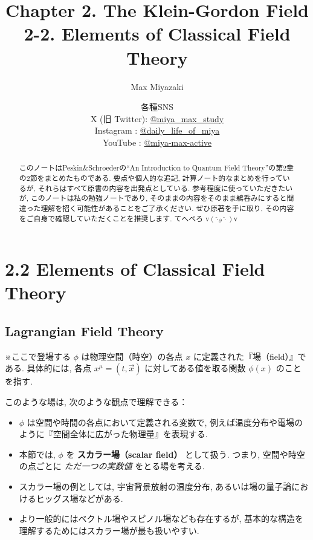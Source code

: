 \documentclass[a4paper,12pt]{article}
\title{Chapter 2. The Klein-Gordon Field\\
2-2. Elements of Classical Field Theory}
\date{各種SNS\\
    X (旧 Twitter): \href{https://x.com/miya_max_study}{@miya\_max\_study}\\
    Instagram : \href{https://www.instagram.com/daily_life_of_miya/}{@daily\_life\_of\_miya}\\
    YouTube : \href{https://www.youtube.com/@miya-max-active}{@miya-max-active}
    }
\author{Max Miyazaki}
\begin{document}
\maketitle

\vspace{1cm}
\begin{abstract}
    このノートはPeskin\&Schroederの``An Introduction to Quantum Field Theory''の第2章の2節をまとめたものである. 要点や個人的な追記, 計算ノート的なまとめを行っているが, それらはすべて原書の内容を出発点としている. 参考程度に使っていただきたいが, このノートは私の勉強ノートであり, そのままの内容をそのまま鵜呑みにすると間違った理解を招く可能性があることをご了承ください. ぜひ原著を手に取り, その内容をご自身で確認していただくことを推奨します. てへぺろ v$({\hat{\cdot}_\partial \hat{\cdot}})$v



\end{abstract}
    
    

\newpage
\section*{2.2 Elements of Classical Field Theory}
\subsection*{Lagrangian Field Theory}

\color{blue}
※ここで登場する $\phi$ は物理空間（時空）の各点 $x$ に定義された『場（field）』である. 具体的には, 各点 $x^\mu = (t, \vec{x})$ に対してある値を取る関数 $\phi(x)$ のことを指す.

このような場は, 次のような観点で理解できる：

\begin{itemize}
    \item $\phi$ は空間や時間の各点において定義される変数で, 例えば温度分布や電場のように『空間全体に広がった物理量』を表現する.
    \item 本節では, $\phi$ を \textbf{スカラー場（scalar field）} として扱う. つまり, 空間や時空の点ごとに \emph{ただ一つの実数値} をとる場を考える.
    \item スカラー場の例としては, 宇宙背景放射の温度分布, あるいは場の量子論におけるヒッグス場などがある.
    \item より一般的にはベクトル場やスピノル場なども存在するが, 基本的な構造を理解するためにはスカラー場が最も扱いやすい.
\end{itemize}
\end{document}
